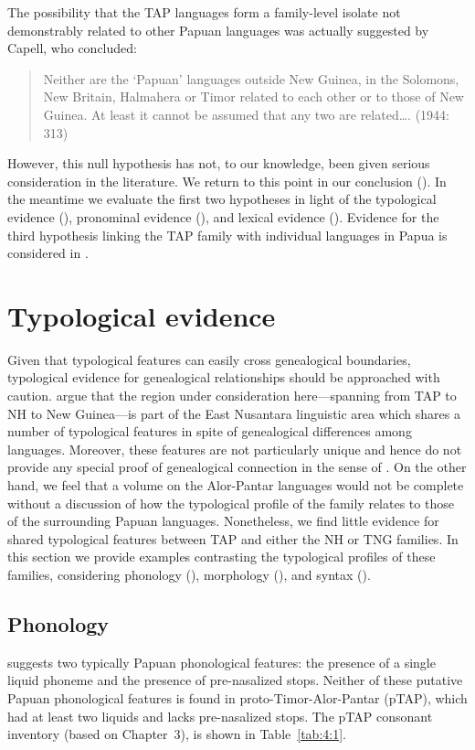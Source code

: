 The possibility that the TAP languages form a family-level isolate not demonstrably related to other Papuan languages was actually suggested by Capell, who concluded:

\begin{quote}
Neither are the `Papuan' languages outside New Guinea, in the Solomons, New Britain, Halmahera or Timor related to each other or to those of New Guinea. At least it cannot be assumed that any two are related{\dots}. (1944: 313)
\end{quote}

However, this null hypothesis has not, to our knowledge, been given serious consideration in the literature. We return to this point in our conclusion (). In the meantime we evaluate the first two hypotheses in light of the typological evidence (), pronominal evidence (), and lexical evidence (). Evidence for the third hypothesis linking the TAP family with individual languages in Papua is considered in .

\section{Typological evidence}\label{sec:4:2}
Given that typological features can easily cross genealogical boundaries, typological evidence for genealogical relationships should be approached with caution. \citet{KlamerEtAl2008} argue that the region under consideration here---spanning from TAP to NH to New Guinea---is part of the East Nusantara linguistic area which shares a number of typological features in spite of genealogical differences among languages. Moreover, these features are not particularly unique and hence do not provide any special proof of genealogical connection in the sense of \citet{Meillet1967}. On the other hand, we feel that a volume on the Alor-Pantar languages would not be complete without a discussion of how the typological profile of the family relates to those of the surrounding Papuan languages. Nonetheless, we find little evidence for shared typological features between TAP and either the NH or TNG families. In this section we provide examples contrasting the typological profiles of these families, considering phonology (), morphology (), and syntax ().

\subsection{Phonology}\label{sec:4:2.1}
\citet{Foley1998} suggests two typically Papuan phonological features: the presence of a single liquid phoneme and the presence of pre-nasalized stops. Neither of these putative Papuan phonological features is found in proto-Timor-Alor-Pantar (pTAP), which had at least two liquids and lacks pre-nasalized stops. The pTAP consonant inventory (based on Chapter~3), is shown in Table~\ref{tab:4:1}.


